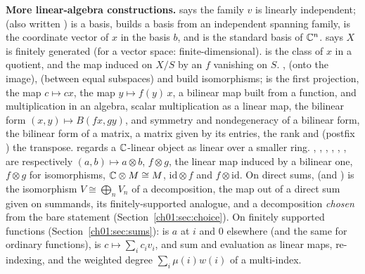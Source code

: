 \textbf{More linear-algebra constructions.}  says the family $v$ is
linearly independent;  (also written ) is a basis,  builds a basis from an independent spanning family,
 is the coordinate vector of $x$ in the basis $b$, and  is the
standard basis of ${\mathbb{C}}^n$.  says $X$ is finitely generated (for a vector space:
finite-dimensional).  is the class of $x$ in a quotient, and
 the map induced on $X/S$ by an $f$ vanishing on $S$. ,
 (onto the image),  (between equal subspaces) and
build isomorphisms;  is the first projection, 
the map $c\mapsto cx$,  the map $y\mapsto f(y)\,x$, 
a bilinear map built from a function,  and  multiplication
in an algebra,  scalar multiplication as a linear map,  the
bilinear form $(x,y)\mapsto B(fx,gy)$,  and  symmetry and
nondegeneracy of a bilinear form,  the bilinear form of a matrix,
 a matrix given by its entries,  the rank and  (postfix ) the transpose.
 regards a ${\mathbb{C}}$-linear object as linear over a smaller ring. ,
, , , ,
,  are
respectively $(a,b)\mapsto a\otimes b$, $f\otimes g$, the linear map induced by a bilinear one,
$f\otimes g$ for isomorphisms, ${\mathbb{C}}\otimes M\cong M$, $\mathrm{id}\otimes f$ and $f\otimes\mathrm{id}$.
On direct sums,  (and ) is the isomorphism
$V\cong\bigoplus_nV_n$ of a decomposition,  the map out of a direct sum given
on summands,  its finitely-supported analogue, and
 a decomposition \emph{chosen} from the bare statement
 (Section~\ref{ch01:sec:choice}). On finitely supported functions
(Section~\ref{ch01:sec:sums}):  is $a$ at $i$ and $0$ elsewhere (and
 the same for ordinary functions),  is
$c\mapsto\sum_ic_iv_i$,  and  sum and evaluation as linear
maps,  re-indexing, and  the weighted degree
$\sum_i\mu(i)w(i)$ of a multi-index.

